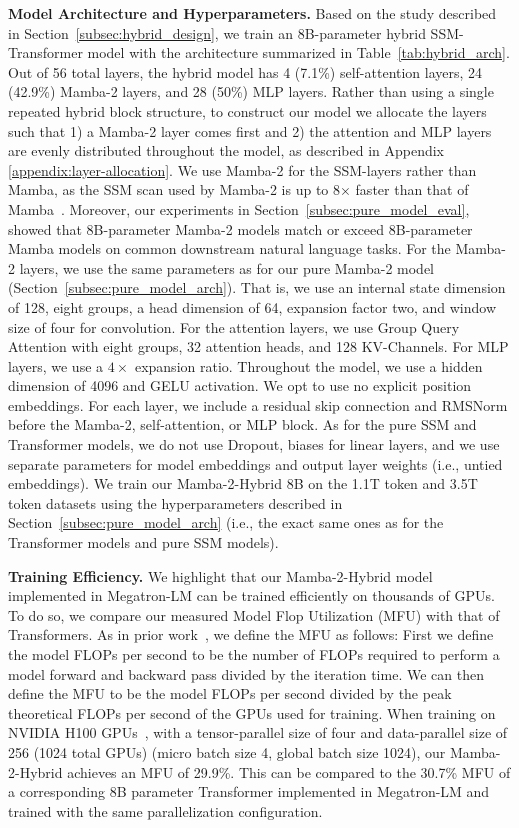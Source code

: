 \textbf{Model Architecture and Hyperparameters.} Based on the study described in Section~\ref{subsec:hybrid_design}, we train an 8B-parameter hybrid SSM-Transformer model with the architecture summarized in Table~\ref{tab:hybrid_arch}. Out of 56 total layers, the hybrid model has 4 (7.1\%) self-attention layers, 24 (42.9\%) Mamba-2 layers, and 28 (50\%) MLP layers. Rather than using a single repeated hybrid block structure, to construct our model we allocate the layers such that 1) a Mamba-2 layer comes first and 2) the attention and MLP layers are evenly distributed throughout the model, as described in Appendix \ref{appendix:layer-allocation}. We use Mamba-2 for the SSM-layers rather than Mamba, as the SSM scan used by Mamba-2 is up to 8$\times$ faster than that of Mamba~\citep{dao2024transformers}. Moreover, our experiments in Section~\ref{subsec:pure_model_eval}, showed that 8B-parameter Mamba-2 models match or exceed 8B-parameter Mamba models on common downstream natural language tasks. For the Mamba-2 layers, we use the same parameters as for our pure Mamba-2 model (Section~\ref{subsec:pure_model_arch}). That is, we use an internal state dimension of 128, eight groups, a head dimension of 64, expansion factor two, and window size of four for convolution. For the attention layers, we use Group Query Attention with eight groups, 32 attention heads, and 128 KV-Channels. For MLP layers, we use a $4\times$ expansion ratio. Throughout the model, we use a hidden dimension of 4096 and GELU activation. We opt to use no explicit position embeddings. For each layer, we include a residual skip connection and RMSNorm before the Mamba-2, self-attention, or MLP block. As for the pure SSM and Transformer models, we do not use Dropout, biases for linear layers, and we use separate parameters for model embeddings and output layer weights (i.e., untied embeddings). We train our Mamba-2-Hybrid 8B on the 1.1T token and 3.5T token datasets using the hyperparameters described in Section~\ref{subsec:pure_model_arch} (i.e., the exact same ones as for the Transformer models and pure SSM models).

\textbf{Training Efficiency.} We highlight that our Mamba-2-Hybrid model implemented in Megatron-LM can be trained efficiently on thousands of GPUs. To do so, we compare our measured Model Flop Utilization (MFU) with that of Transformers. As in prior work~\citep{korthikanti2205reducing}, we define the MFU as follows: First we define the model FLOPs per second to be the number of FLOPs required to perform a model forward and backward pass divided by the iteration time. We can then define the MFU to be the model FLOPs per second divided by the peak theoretical FLOPs per second of the GPUs used for training. When training on NVIDIA H100 GPUs~\citep{h100}, with a tensor-parallel size of four and data-parallel size of 256 (1024 total GPUs) (micro batch size 4, global batch size 1024), our Mamba-2-Hybrid achieves an MFU of 29.9\%. This can be compared to the 30.7\% MFU of a corresponding 8B parameter Transformer implemented in Megatron-LM and trained with the same parallelization configuration. 

